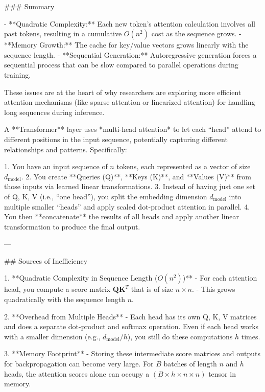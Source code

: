 ### Summary

- **Quadratic Complexity:** Each new token’s attention calculation involves all past tokens, resulting in a cumulative \( O(n^2) \) cost as the sequence grows.
- **Memory Growth:** The cache for key/value vectors grows linearly with the sequence length.
- **Sequential Generation:** Autoregressive generation forces a sequential process that can be slow compared to parallel operations during training.

These issues are at the heart of why researchers are exploring more efficient attention mechanisms (like sparse attention or linearized attention) for handling long sequences during inference.







A **Transformer** layer uses *multi-head attention* to let each “head” attend to different positions in the input sequence, potentially capturing different relationships and patterns. Specifically:

1. You have an input sequence of \(n\) tokens, each represented as a vector of size \(d_{\text{model}}\).
2. You create **Queries (Q)**, **Keys (K)**, and **Values (V)** from those inputs via learned linear transformations.
3. Instead of having just one set of Q, K, V (i.e., “one head”), you split the embedding dimension \(d_{\text{model}}\) into multiple smaller “heads” and apply scaled dot-product attention in parallel.
4. You then **concatenate** the results of all heads and apply another linear transformation to produce the final output.

---

## Sources of Inefficiency

1. **Quadratic Complexity in Sequence Length (\(O(n^2)\))**  
   - For each attention head, you compute a score matrix \(\mathbf{Q}\mathbf{K}^T\) that is of size \(n \times n\).  
   - This grows quadratically with the sequence length \(n\).  

2. **Overhead from Multiple Heads**  
   - Each head has its own Q, K, V matrices and does a separate dot-product and softmax operation. Even if each head works with a smaller dimension (e.g., \(d_{\text{model}} / h\)), you still do these computations \(h\) times.  

3. **Memory Footprint**  
   - Storing these intermediate score matrices and outputs for backpropagation can become very large. For \(B\) batches of length \(n\) and \(h\) heads, the attention scores alone can occupy a \((B \times h \times n \times n)\) tensor in memory.  

